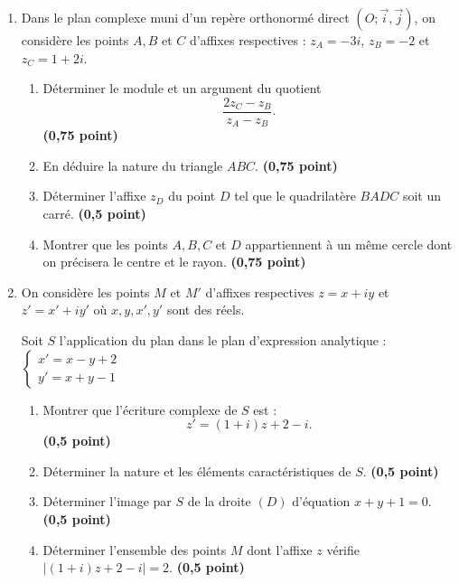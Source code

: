 \documentclass[12pt,a4paper]{article}
\begin{document}
\begin{enumerate}

\item Dans le plan complexe muni d’un repère orthonormé direct \( (O; \vec{i}, \vec{j}) \), on considère les points \( A, B \) et \( C \) d’affixes respectives :  
   \( z_A = -3i \), \( z_B = -2 \) et \( z_C = 1 + 2i \).

\begin{enumerate}
    \item Déterminer le module et un argument du quotient  
          \[
          \frac{2z_C - z_B}{z_A - z_B}.
          \]
          \hfill \textbf{(0,75 point)}
          
    \item En déduire la nature du triangle \( ABC \).  
          \hfill \textbf{(0,75 point)}
          
    \item Déterminer l’affixe \( z_D \) du point \( D \) tel que le quadrilatère \( BADC \) soit un carré.  
          \hfill \textbf{(0,5 point)}
          
    \item Montrer que les points \( A, B, C \) et \( D \) appartiennent à un même cercle dont on précisera le centre et le rayon.  
          \hfill \textbf{(0,75 point)}
\end{enumerate}

\item On considère les points \( M \) et \( M' \) d’affixes respectives \( z = x + iy \) et \( z' = x' + iy' \) où \( x, y, x', y' \) sont des réels.

Soit \( S \) l’application du plan dans le plan d’expression analytique : \( \begin{cases}
    x' = x - y + 2 \\
    y' = x + y - 1
\end{cases} \)

\begin{enumerate}
    \item Montrer que l’écriture complexe de \( S \) est :  
          \[
          z' = (1 + i)z + 2 - i.
          \]
          \hfill \textbf{(0,5 point)}
          
    \item Déterminer la nature et les éléments caractéristiques de \( S \).  
          \hfill \textbf{(0,5 point)}
          
    \item Déterminer l’image par \( S \) de la droite \( (D) \) d’équation \( x + y + 1 = 0 \).  
          \hfill \textbf{(0,5 point)}
          
    \item Déterminer l’ensemble des points \( M \) dont l’affixe \( z \) vérifie \( |(1 + i)z + 2 - i| = 2 \).  
          \hfill \textbf{(0,5 point)}
\end{enumerate}
\end{enumerate}
\end{document}
